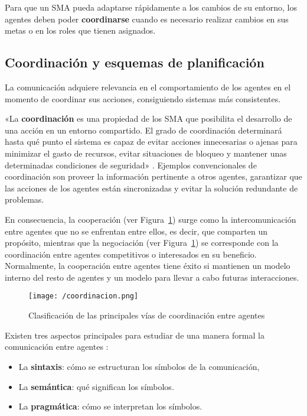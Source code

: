 Para que un \acs{SMA} pueda adaptarse rápidamente a los cambios de su entorno, los agentes deben poder \textbf{coordinarse} cuando es necesario realizar cambios en sus metas o en los roles que tienen asignados.

\subsection{Coordinación y esquemas de planificación}
\label{sec:esquemascoordinacion}

La comunicación adquiere relevancia en el comportamiento de los agentes en el momento de coordinar sus acciones, consiguiendo sistemas más consistentes. 

«La \textbf{coordinación} es una propiedad de los \acs{SMA} que posibilita el desarrollo de una acción en un entorno compartido. El grado de coordinación determinará hasta qué punto el sistema es capaz de evitar acciones innecesarias o ajenas para minimizar el gasto de recursos, evitar situaciones de bloqueo y mantener unas determinadas condiciones de seguridad» \cite{coordinacion}. Ejemplos convencionales de coordinación son proveer la información pertinente a otros agentes, garantizar que las acciones de los agentes están sincronizadas y evitar la solución redundante de problemas.

En consecuencia, la cooperación (ver Figura~\ref{fig:coordinacion}) surge como la intercomunicación entre agentes que no se enfrentan entre ellos, es decir, que comparten un propósito, mientras que la negociación (ver Figura~\ref{fig:coordinacion}) se corresponde con la coordinación entre agentes competitivos o interesados en su beneficio. Normalmente, la cooperación entre agentes tiene éxito si mantienen un modelo interno del resto de agentes y un modelo para llevar a cabo futuras interacciones.

\begin{figure}[!h]
\begin{center}
\texttt{[image: /coordinacion.png]}
\caption[Clasificación de las principales vías de coordinación entre agentes]{Clasificación de las principales vías de coordinación entre agentes \cite{coordinacion2}}
\label{fig:coordinacion}
\end{center}
\end{figure}

Existen tres aspectos principales para estudiar de una manera formal la comunicación entre agentes \cite{coordinacion}: 
\begin{itemize}
\item La \textbf{sintaxis}: cómo se estructuran los símbolos de la comunicación,
\item La \textbf{semántica}: qué significan los símbolos.
\item La \textbf{pragmática}: cómo se interpretan los símbolos.
\end{itemize}

